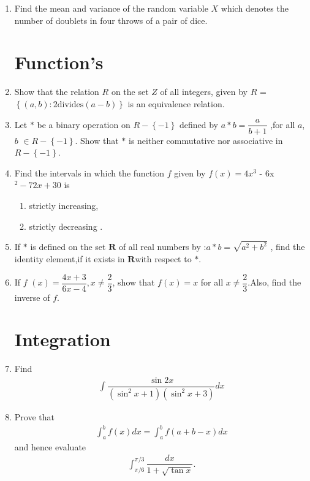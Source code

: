\documentclass[12pt,-letter paper]{article}
\providecommand{\cbrak}[1]{\ensuremath{\left\{#1\right\}}}
\providecommand{\brak}[1]{\ensuremath{\left(#1\right)}}
\begin{document}
\begin{enumerate}
\item Find the mean and variance of the random variable $X$ which denotes the number of doublets in four throws of a pair of dice.

\section{Function's}
    
\item Show that the relation $R$ on the set $Z$ of all integers, given by $R$ =$\cbrak {\brak{a, b}:2 \text{divides} \brak{a - b}}$ is an equivalence relation.

\item Let $*$ be a binary operation on $R-\cbrak{-1}$ defined by $a * b = \dfrac{a}{b+1}$ ,for all $a$, $b$ $\in R -\cbrak{-1}$.
Show that $*$ is neither commutative nor associative in $R-\cbrak{-1}$.

\item Find the intervals in which the function $f$ given by $f(x) = 4x^{3}$ - 6x$^{2}-72x+ 30$ is
\begin{enumerate}
    \item  strictly increasing,
     \item strictly decreasing .
\end{enumerate}

\item If $*$ is defined on the set $\textbf{R}$ of all real numbers by :$ a * b =\sqrt{a^{2}+b^{2}}$ ,
find the identity element,if it exists in $\textbf{R}$with respect to $*$.

\item If $f$ $\brak{x}=\dfrac{4x+3}{6x-4},x \neq  \dfrac{2}{3} $, show that $f \brak{x}= x$ for all $x\neq \dfrac{2}{3}$.Also, find the inverse of $f$.

\section{Integration}

\item Find
\begin{align*}
\int\dfrac{\sin{2}x}{(\sin^{2}x+1)(\sin^{2}x+3)} dx
\end{align*}

\item Prove that 
\begin{align*}
\int_{a}^{b} f(x)dx=\int_{a}^{b}{f(a+b-x)dx}
\end{align*}
and hence evaluate
\begin{align*}
    \int_{\pi/6}^{\pi/3}\dfrac{dx}{1+\sqrt{\tan{x}}}.
\end{align*}


\end{enumerate}
\end{document}

